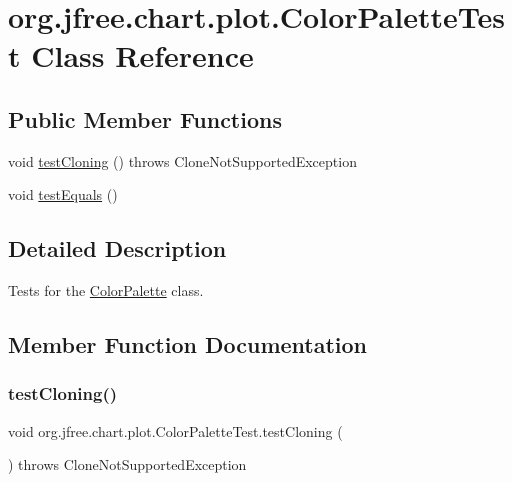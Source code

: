 \hypertarget{classorg_1_1jfree_1_1chart_1_1plot_1_1_color_palette_test}{}\section{org.\+jfree.\+chart.\+plot.\+Color\+Palette\+Test Class Reference}
\label{classorg_1_1jfree_1_1chart_1_1plot_1_1_color_palette_test}
\subsection*{Public Member Functions}
\begin{DoxyCompactItemize}
\item 
void \mbox{\hyperlink{classorg_1_1jfree_1_1chart_1_1plot_1_1_color_palette_test_a561d55c5f588b3ad3239e9e559b56d1a}{test\+Cloning}} ()  throws Clone\+Not\+Supported\+Exception 
\item 
void \mbox{\hyperlink{classorg_1_1jfree_1_1chart_1_1plot_1_1_color_palette_test_a5ac6e86e29b9ceb11319e11c60803f6d}{test\+Equals}} ()
\end{DoxyCompactItemize}


\subsection{Detailed Description}
Tests for the {\ttfamily \mbox{\hyperlink{classorg_1_1jfree_1_1chart_1_1plot_1_1_color_palette}{Color\+Palette}}} class. 

\subsection{Member Function Documentation}
\mbox{\label{classorg_1_1jfree_1_1chart_1_1plot_1_1_color_palette_test_a561d55c5f588b3ad3239e9e559b56d1a}} 
\subsubsection{\texorpdfstring{test\+Cloning()}{testCloning()}}
{\footnotesize\ttfamily void org.\+jfree.\+chart.\+plot.\+Color\+Palette\+Test.\+test\+Cloning (\begin{DoxyParamCaption}{ }\end{DoxyParamCaption}) throws Clone\+Not\+Supported\+Exception}

